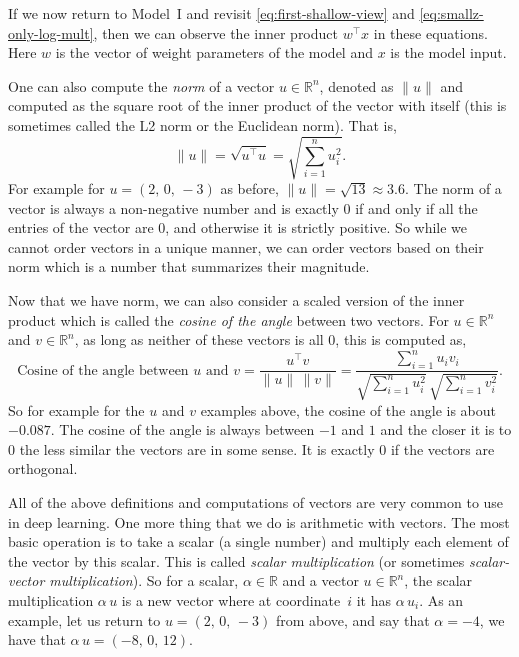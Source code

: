 \documentclass[12pt]{article}
\begin{document}
If we now return to Model~I and revisit \eqref{eq:first-shallow-view} and \eqref{eq:smallz-only-log-mult}, then we can observe the inner product $w^\top x$ in these equations. Here $w$ is the vector of weight parameters of the model and $x$ is the model input.

One can also compute the {\em norm}  of a vector $u \in {\mathbb R}^n$, denoted as $\| u\|$ and computed as the square root of the inner product of the vector with itself (this is sometimes called the L2 norm or the Euclidean norm). That is,
%
\begin{equation}
\label{eq:norm-vec}
\| u \| = \sqrt{u^\top u} = \sqrt{\sum_{i=1}^n u_i^2}.
\end{equation}
%
For example for $u=(2, \, 0,\, -3)$ as before, $\| u \| = \sqrt{13} \approx 3.6$. The norm of a vector is always a non-negative number and is exactly $0$ if and only if all the entries of the vector are $0$, and otherwise it is strictly positive. So while we cannot order vectors in a unique manner, we can order vectors based on their norm which is a number  that summarizes their magnitude. 

Now that we have norm, we can also consider a scaled version of the inner product which is called the {\em cosine of the angle} between two vectors. For $u \in {\mathbb R}^n$ and $v \in {\mathbb R}^n$, as long as neither of these vectors is all $0$, this is computed as,
%
\begin{equation}
\label{eq:cosine-angle-vec}
\textrm{Cosine of the angle between $u$ and $v$} = \frac{u^\top v}{\|u \|\, \|v\|} = \frac{\sum_{i=1}^n u_i v_i}{\sqrt{\sum_{i=1}^n u_i^2} \, \sqrt{\sum_{i=1}^n v_i^2 }}.
\end{equation}
%
So for example for the $u$ and $v$ examples above, the cosine of the angle is about $-0.087$. The cosine of the angle is always between $-1$ and $1$ and the closer it is to $0$ the less similar the vectors are in some sense. It is exactly $0$ if the vectors are orthogonal.

All of the above definitions and computations of vectors are very common to use in deep learning. One more thing that we do is arithmetic with vectors. The most basic operation is to take a scalar (a single number) and multiply each element of the vector by this scalar. This is called {\em scalar multiplication} (or sometimes {\em scalar-vector multiplication}). So for a scalar, $\alpha \in {\mathbb R}$ and a vector $u \in {\mathbb R}^n$, the scalar multiplication $\alpha \, u$ is a new vector where at coordinate~$i$ it has $\alpha \, u_i$. As an example, let us return to $u=(2,\,0,\,-3)$ from above, and say that $\alpha = -4$, we have that $\alpha \, u = (-8, \,0,\, 12)$.
\end{document}
